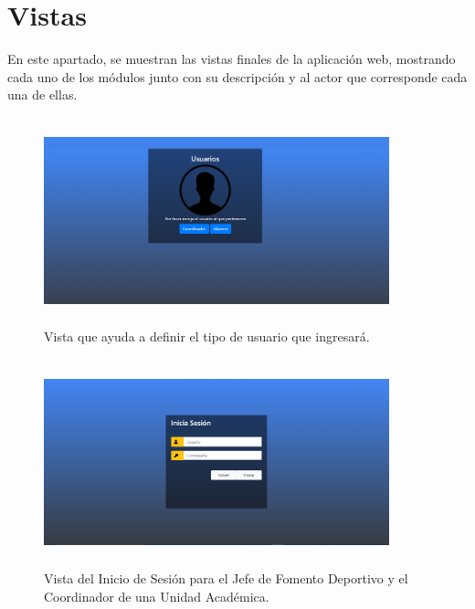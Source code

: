 	\chapter{Vistas}
	\noindent En este apartado, se muestran las vistas finales de la aplicación web, mostrando cada uno de los módulos junto con su descripción y al actor que corresponde cada una de ellas.
		
		\begin{figure} [hbt!]
			\centering
			\includegraphics[width=10cm, height=6cm]{Imagenes/Vistas/VIsta1_TipoSesion}
			\caption{Vista que ayuda a definir el tipo de usuario que ingresará.}
			\label{VistaTipoSesion}
		\end{figure}
	
		\begin{figure} [hbt!]
			\centering
			\includegraphics[width=10cm, height=6cm]{Imagenes/Vistas/Vista2_InicioSesionJFD}
			\caption{Vista del Inicio de Sesión para el Jefe de Fomento Deportivo y el Coordinador de una Unidad Académica.}
			\label{VistaInicioSesionJFD}
		\end{figure}
	
